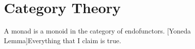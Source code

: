 \documentclass[12pt]{article}
\begin{document}
    \section{Category Theory}\label{sec:simps}
    A monad is a monoid in the category of endofunctors.
    [Yoneda Lemma]{Everything that I claim is true.}
\end{document}
